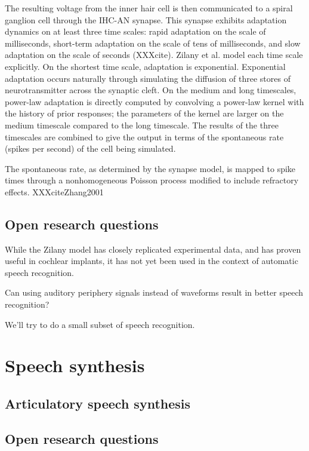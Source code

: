 \documentclass{article}
\begin{document}
The resulting voltage from the inner hair cell
is then communicated to a spiral ganglion cell
through the IHC-AN synapse.
This synapse exhibits adaptation dynamics
on at least three time scales:
rapid adaptation on the scale of milliseconds,
short-term adaptation on the scale of tens of milliseconds,
and slow adaptation on the scale of seconds
(XXXcite).
Zilany et al. model each time scale explicitly.
On the shortest time scale,
adaptation is exponential.
Exponential adaptation occurs naturally
through simulating the diffusion
of three stores of neurotransmitter
across the synaptic cleft.
On the medium and long timescales,
power-law adaptation is directly computed
by convolving a power-law kernel with
the history of prior responses;
the parameters of the kernel
are larger on the medium timescale
compared to the long timescale.
The results of the three timescales
are combined to give the output
in terms of the spontaneous rate
(spikes per second) of the cell being simulated.

The spontaneous rate,
as determined by the synapse model,
is mapped to spike times
through a nonhomogeneous Poisson process
modified to include refractory effects.
XXXciteZhang2001

\subsection{Open research questions}

While the Zilany model
has closely replicated experimental data,
and has proven useful in cochlear implants,
it has not yet been used in the context
of automatic speech recognition.

Can using auditory periphery signals
instead of waveforms
result in better speech recognition?

We'll try to do a small subset of speech recognition.

\section{Speech synthesis}

\subsection{Articulatory speech synthesis}

\subsection{Open research questions}
\end{document}
